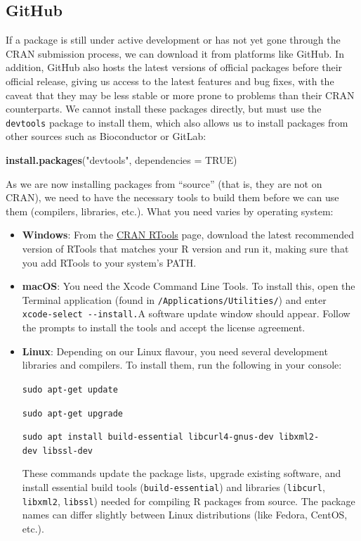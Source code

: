 \documentclass[
]{book}
\newenvironment{Shaded}{\begin{snugshade}}{\end{snugshade}}
\newcommand{\AttributeTok}[1]{\textcolor[rgb]{0.13,0.29,0.53}{#1}}
\newcommand{\ConstantTok}[1]{\textcolor[rgb]{0.56,0.35,0.01}{#1}}
\newcommand{\FunctionTok}[1]{\textcolor[rgb]{0.13,0.29,0.53}{\textbf{#1}}}
\newcommand{\NormalTok}[1]{#1}
\newcommand{\StringTok}[1]{\textcolor[rgb]{0.31,0.60,0.02}{#1}}
\begin{document}
\subsection{GitHub}\label{github}

If a package is still under active development or has not yet gone through the CRAN submission process, we can download it from platforms like GitHub. In addition, GitHub also hosts the latest versions of official packages before their official release, giving us access to the latest features and bug fixes, with the caveat that they may be less stable or more prone to problems than their CRAN counterparts. We cannot install these packages directly, but must use the \texttt{devtools} package to install them, which also allows us to install packages from other sources such as Bioconductor or GitLab:

\begin{Shaded}
\begin{Highlighting}[]
\FunctionTok{install.packages}\NormalTok{(}\StringTok{"devtools"}\NormalTok{, }\AttributeTok{dependencies =} \ConstantTok{TRUE}\NormalTok{)}
\end{Highlighting}
\end{Shaded}

As we are now installing packages from ``source'' (that is, they are not on CRAN), we need to have the necessary tools to build them before we can use them (compilers, libraries, etc.). What you need varies by operating system:

\begin{itemize}
\item
  \textbf{Windows}: From the \href{https://cran.r-project.org/bin/windows/Rtools/}{CRAN RTools} page, download the latest recommended version of RTools that matches your R version and run it, making sure that you add RTools to your system's PATH.
\item
  \textbf{macOS}: You need the Xcode Command Line Tools. To install this, open the Terminal application (found in \texttt{/Applications/Utilities/}) and enter \texttt{xcode-select\ -\/-install.}A software update window should appear. Follow the prompts to install the tools and accept the license agreement.
\item
  \textbf{Linux}: Depending on our Linux flavour, you need several development libraries and compilers. To install them, run the following in your console:

  \texttt{sudo\ apt-get\ update}

  \texttt{sudo\ apt-get\ upgrade}

  \texttt{sudo\ apt\ install\ build-essential\ libcurl4-gnus-dev\ libxml2-dev\ libssl-dev}

  These commands update the package lists, upgrade existing software, and install essential build tools (\texttt{build-essential}) and libraries (\texttt{libcurl}, \texttt{libxml2}, \texttt{libssl}) needed for compiling R packages from source. The package names can differ slightly between Linux distributions (like Fedora, CentOS, etc.).
\end{itemize}
\end{document}

